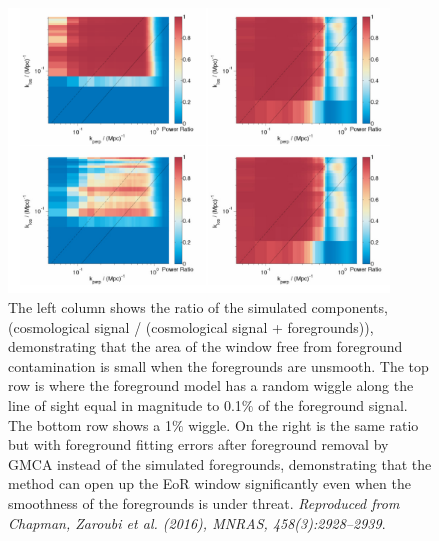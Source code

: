 \begin{figure}
\begin{center}
    \includegraphics[width=0.9\textwidth]{Chapman_Jelic/Images/Em_window.png}
\end{center}
    \caption{The left column shows the ratio of the simulated components, (cosmological signal / (cosmological signal + foregrounds)), demonstrating that the area of the window free from foreground contamination is small when the foregrounds are unsmooth. The top row is where the foreground model has a random wiggle along the line of sight equal in magnitude to 0.1$\%$ of the foreground signal. The bottom row shows a 1$\%$ wiggle. On the right is the same ratio but with foreground fitting errors after foreground removal by GMCA instead of the simulated foregrounds, demonstrating that the method can open up the EoR window significantly even when the smoothness of the foregrounds is under threat. \textit{Reproduced from Chapman, Zaroubi et al. (2016), MNRAS, 458(3):2928--2939}.}
    \label{fig:Chap_window}
\end{figure}

